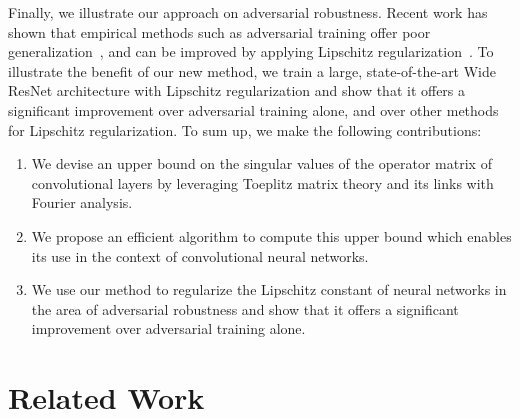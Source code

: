 Finally, we illustrate our approach on adversarial robustness.
Recent work has shown that empirical methods such as adversarial training offer poor generalization~\cite{schmidt2018adversarially}, and can be improved by applying Lipschitz regularization~\cite{farnia2018generalizable}.
To illustrate the benefit of our new method, we train a large, state-of-the-art Wide ResNet architecture with Lipschitz regularization and show that it offers a significant improvement over adversarial training alone, and over other methods for Lipschitz regularization.
To sum up, we make the following  contributions:
\begin{enumerate}
    \item We devise an upper bound on the singular values of the operator matrix of convolutional layers by leveraging Toeplitz matrix theory and its links with Fourier analysis. 
    \item We propose an efficient algorithm to compute this upper bound which enables its use in the context of convolutional neural networks.
    \item We use our method to regularize the Lipschitz constant of neural networks in the area of adversarial robustness and show that it offers a significant improvement over adversarial training alone.
\end{enumerate}

\section{Related Work}
\label{sec:related_work}

